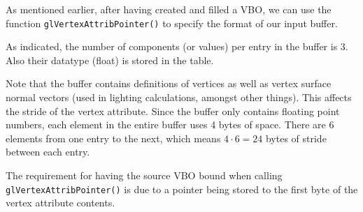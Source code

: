 
As mentioned earlier, after having created and filled a VBO, we can use the function \texttt{glVertexAttribPointer()} to specify the format of our input buffer. 

As indicated, the number of components (or values) per entry in the buffer is 3. Also their datatype (float) is stored in the table.

Note that the buffer contains definitions of vertices as well as vertex surface normal vectors (used in lighting calculations, amongst other things). This affects the stride of the vertex attribute. Since the buffer only contains floating point numbers, each element in the entire buffer uses 4 bytes of space. There are 6 elements from one entry to the next, which means $4 \cdot 6 = 24$ bytes of stride between each entry.

The requirement for having the source VBO bound when calling \texttt{glVertexAttribPointer()} is due to a pointer being stored to the first byte of the vertex attribute contents. 

\newpage


